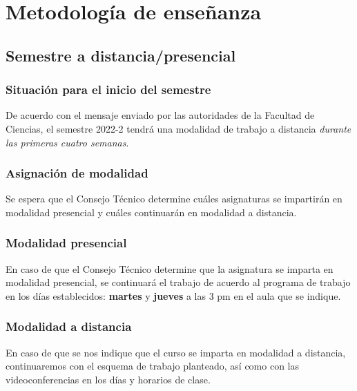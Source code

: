 \documentclass[12pt]{beamer}
\begin{document}
\section{Metodología de enseñanza}
\subsection{Semestre a distancia/presencial}

\begin{frame}
\frametitle{Situación para el inicio del semestre}
De acuerdo con el mensaje enviado por las autoridades de la Facultad de Ciencias, el semestre 2022-2 tendrá una modalidad de trabajo a distancia \emph{durante las primeras cuatro semanas}.
\end{frame}
\begin{frame}
\frametitle{Asignación de modalidad}
Se espera que el Consejo Técnico determine cuáles asignaturas se impartirán en modalidad presencial y cuáles continuarán en modalidad a distancia.
\end{frame}
\begin{frame}
\frametitle{Modalidad presencial}
En caso de que el Consejo Técnico determine que la asignatura se imparta en modalidad presencial, se continuará el trabajo de acuerdo al programa de trabajo en los días establecidos: \textbf{martes} y \textbf{jueves}  a las 3 pm en el aula que se indique.
\end{frame}
\begin{frame}
\frametitle{Modalidad a distancia}
En caso de que se nos indique que el curso se imparta en modalidad a distancia, continuaremos con el esquema de trabajo planteado, así como con las videoconferencias en los días y horarios de clase. 
\end{frame}

{

}

{

}
\end{document}
